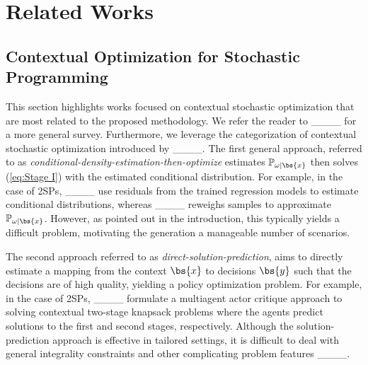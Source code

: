 \section{Related Works}
\label{section:Literature}


\subsection{Contextual Optimization for Stochastic Programming}


This section highlights works focused on contextual stochastic optimization that are most related to the proposed methodology. We refer the reader to ____ for a more general survey.  Furthermore, we leverage the categorization of contextual stochastic optimization introduced by ____. The first general approach, referred to as \textit{conditional-density-estimation-then-optimize} estimates $\mathbb{P}_{\omega|\bs{x}}$ then solves (\ref{eq:Stage I}) with the estimated conditional distribution. For example, in the case of 2SPs, ____ use residuals from the trained regression models to estimate conditional distributions, whereas ____ reweighs samples to approximate $\mathbb{P}_{\omega|\bs{x}}$. However, as pointed out in the introduction, this typically yields a difficult problem, motivating the generation a manageable number of scenarios. 

The second approach referred to as \textit{direct-solution-prediction}, aims to directly estimate a mapping from the context $\bs{x}$ to decisions $\bs{y}$ such that the decisions are of high quality, yielding a policy optimization problem. For example, in the case of 2SPs, ____ formulate a multiagent actor critique approach to solving contextual two-stage knapsack problems where the agents predict solutions to the first and second stages, respectively. Although the solution-prediction approach is effective in tailored settings, it is difficult to deal with general integrality constraints and other complicating problem features ____. 

